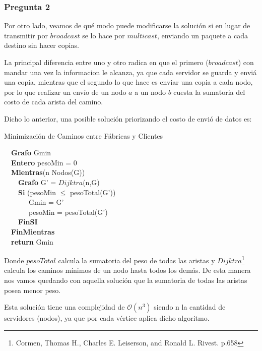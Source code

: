 \subsubsection{Pregunta 2}

 Por otro lado, veamos de qué modo puede modificarse la solución si en lugar de transmitir por $broadcast$ se lo hace por $multicast$, enviando un paquete a cada destino sin hacer copias. \newline

 La principal diferencia entre uno y otro radica en que el primero ($broadcast$) con mandar una vez la informacion le alcanza, ya que cada servidor se guarda y enviá una copia, mientras que el segundo lo que hace es enviar una copia a cada nodo, por lo que realizar un envío de un nodo $a$ a un nodo $b$ cuesta la sumatoria del costo de cada arista del camino. \newline

 Dicho lo anterior, una posible solución priorizando el costo de envió de datos es: \newline

\begin{algorithm}[H]
	\SetAlgoLined
	\caption{Minimización de Caminos entre Fábricas y Clientes}
	\ \ \textbf{Grafo} Gmin \\
	\ \ \textbf{Entero} pesoMin = 0 \\
	\ \ \textbf{Mientras}(n \in Nodos(G)) \\
				\ \ \ \ \textbf{Grafo} G' = $Dijktra$(n,G) \\
				\ \ \ \ \textbf{Si} (pesoMin $\leq$ pesoTotal(G')) \\
	      \ \ \ \ \ \ \ Gmin = G' \\
	      \ \ \ \ \ \ \ pesoMin = pesoTotal(G') \\
				\ \ \ \ \textbf{FinSI} \\
		\ \ \textbf{FinMientras} \\
		\ \ \textbf{return} Gmin 
\end{algorithm}

Donde $pesoTotal$ calcula la sumatoria del peso de todas las aristas y  $Dijktra$\footnote{Cormen, Thomas H., Charles E. Leiserson, and Ronald L. Rivest. p.658} calcula los caminos mínimos de un nodo hasta todos los demás. De esta manera nos vamos quedando con aquella solución que la sumatoria de todas las aristas posea menor peso. \newline

Esta solución tiene una complejidad de $\mathcal{O}(n^{3})$ siendo n la cantidad de servidores (nodos), ya que por cada vértice aplica dicho algoritmo.\newline
